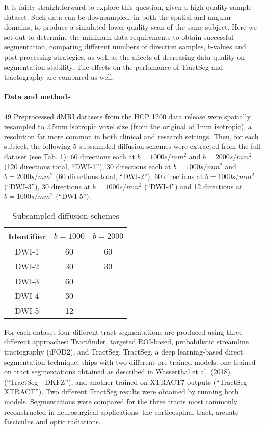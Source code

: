 It is fairly straightforward to explore this question, given a high quality sample dataset.
Such data can be downsampled, in both the spatial and angular domains, to produce a simulated lower quality scan of the same subject.
Here we set out to determine the minimum data requirements to obtain successful segmentation, comparing different numbers of direction samples, $b$-values and post-processing strategies, as well as the affects of decreasing data quality on segmentation stability.
The effects on the perfomance of TractSeg and tractography are compared as well.

\paragraph*{Data and methods}

49 Preprocessed dMRI datasets from the HCP 1200 data release were spatially resampled to 2.5mm isotropic voxel size (from the original of 1mm isotropic), a resolution far more common in both clinical and research settings.
Then, for each subject, the following 5 subsampled diffusion schemes were extracted from the full dataset (see Tab. \ref{tab:subschemes}):
60 directions each at $b=1000s/mm^2$ and $b=2000s/mm^2$ (120 directions total, ``DWI-1”), 30 directions each at $b=1000s/mm^2$ and $b=2000s/mm^2$ (60 directions total, ``DWI-2”), 60 directions at $b=1000s/mm^2$ (``DWI-3”), 30 directions at $b=1000s/mm^2$ (``DWI-4”) and 12 directions at $b=1000s/mm^2$ (``DWI-5”).

\begin{table}
  \centering
  \begin{tabular}{c c c}
    Identifier & $b = 1000$ & $b=2000$ \\
    \hline
    DWI-1 & 60 & 60 \\
    DWI-2 & 30 & 30 \\
    DWI-3 & 60 &    \\
    DWI-4 & 30 &    \\
    DWI-5 & 12 &    \\
  \end{tabular}
  \caption{Subsampled diffusion schemes}
  \label{tab:subschemes}
\end{table}

For each dataset four different tract segmentations are produced using three different approaches: Tractfinder, targeted ROI-based, probabilistic streamline tractography (iFOD2), and TractSeg.
TractSeg, a deep learning-based direct segmentation technique, ships with two different pre-trained models:
one trained on tract segmentations obtained as described in Wasserthal et al. (2018) (``TractSeg - DKFZ”), and another trained on XTRACT7 outputs (``TractSeg - XTRACT”).
Two different TractSeg results were obtained by running both models.
Segmentations were compared for the three tracts most commonly reconstructed in neurosurgical applications: the corticospinal tract, arcuate fasciculus and optic radiations.

